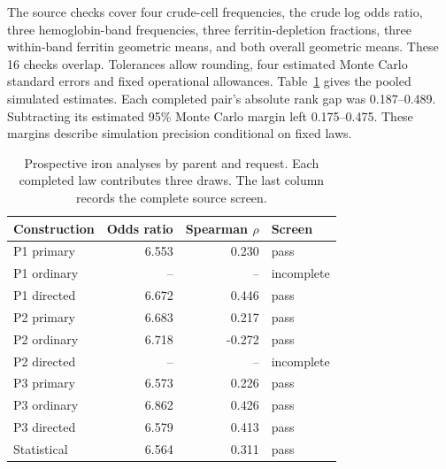The source checks cover four crude-cell frequencies, the crude log odds ratio, three hemoglobin-band frequencies, three ferritin-depletion fractions, three within-band ferritin geometric means, and both overall geometric means. These 16 checks overlap. Tolerances allow rounding, four estimated Monte Carlo standard errors and fixed operational allowances. Table~\ref{tab:ironprospective} gives the pooled simulated estimates. Each completed pair's absolute rank gap was 0.187--0.489. Subtracting its estimated 95\% Monte Carlo margin left 0.175--0.475. These margins describe simulation precision conditional on fixed laws.

\begin{table}[H]
\caption{Prospective iron analyses by parent and request. Each completed law contributes three draws. The last column records the complete source screen.}
\label{tab:ironprospective}
\centering
\begin{tabular}{@{}lrrl@{}}
\toprule
Construction & Odds ratio & Spearman $\rho$ & Screen\\
\midrule
P1 primary & 6.553 & 0.230 & pass\\
P1 ordinary & -- & -- & incomplete\\
P1 directed & 6.672 & 0.446 & pass\\
P2 primary & 6.683 & 0.217 & pass\\
P2 ordinary & 6.718 & -0.272 & pass\\
P2 directed & -- & -- & incomplete\\
P3 primary & 6.573 & 0.226 & pass\\
P3 ordinary & 6.862 & 0.426 & pass\\
P3 directed & 6.579 & 0.413 & pass\\
Statistical & 6.564 & 0.311 & pass\\
\bottomrule
\end{tabular}
\end{table}

